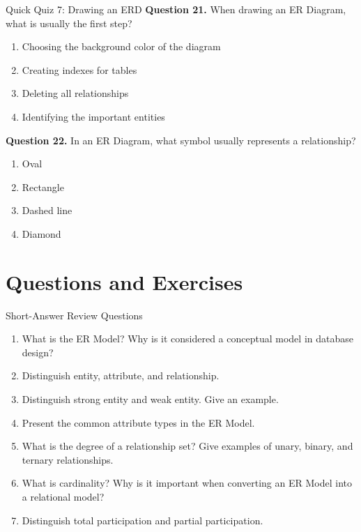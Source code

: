 \documentclass[aspectratio=169,11pt]{beamer}
\newcommand{\tightlist}{\setlength{\itemsep}{2pt}\setlength{\parskip}{0pt}}
\newcommand{\smallitem}{\setlength{\itemsep}{2pt}\setlength{\parskip}{0pt}}
\newcommand{\qoption}[2]{\item[#1.] #2}
\begin{document}
\begin{frame}{Quick Quiz 7: Drawing an ERD}
\small
\textbf{Question 21.} When drawing an ER Diagram, what is usually the first step?
\begin{enumerate}
\tightlist
  \qoption{A}{Choosing the background color of the diagram}
  \qoption{B}{Creating indexes for tables}
  \qoption{C}{Deleting all relationships}
  \qoption{D}{Identifying the important entities}
\end{enumerate}

\textbf{Question 22.} In an ER Diagram, what symbol usually represents a relationship?
\begin{enumerate}
\tightlist
  \qoption{A}{Oval}
  \qoption{B}{Rectangle}
  \qoption{C}{Dashed line}
  \qoption{D}{Diamond}
\end{enumerate}
\end{frame}

\section{Questions and Exercises}

\begin{frame}[allowframebreaks]{Short-Answer Review Questions}
\small
\begin{enumerate}
\smallitem
  \item What is the ER Model? Why is it considered a conceptual model in database design?
  \item Distinguish entity, attribute, and relationship.
  \item Distinguish strong entity and weak entity. Give an example.
  \item Present the common attribute types in the ER Model.
  \item What is the degree of a relationship set? Give examples of unary, binary, and ternary relationships.
  \item What is cardinality? Why is it important when converting an ER Model into a relational model?
  \item Distinguish total participation and partial participation.
\end{enumerate}
\end{frame}
\end{document}

